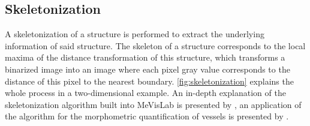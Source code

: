 \subsection{Skeletonization}
A skeletonization of a structure is performed to extract the underlying information of said structure. The skeleton of a structure corresponds to the local maxima of the distance transformation of this structure, which transforms a binarized image into an image where each pixel gray value corresponds to the distance of this pixel to the nearest boundary. \autoref{fig:skeletonization} explains the whole process in a two-dimensional example. An in-depth explanation of the skeletonization algorithm built into MeVisLab is presented by  \citet{Selle2002}, an application of the algorithm for the morphometric quantification of vessels is presented by \citet{Boskamp2004}.

